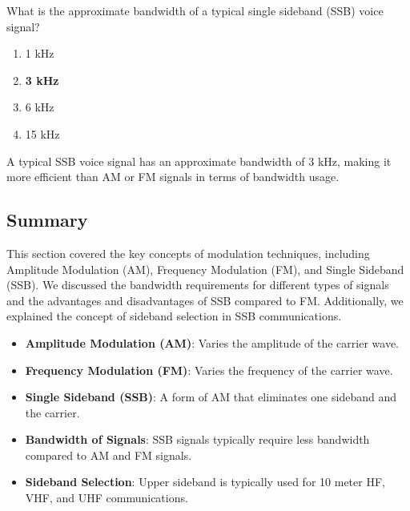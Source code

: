 
\begin{tcolorbox}[colback=gray!10!white,colframe=black!75!black,title={T8A08}]
    What is the approximate bandwidth of a typical single sideband (SSB) voice signal?
    \begin{enumerate}[label=\Alph*,noitemsep]
        \item 1 kHz
        \item \textbf{3 kHz}
        \item 6 kHz
        \item 15 kHz
    \end{enumerate}
\end{tcolorbox}
A typical SSB voice signal has an approximate bandwidth of 3 kHz, making it more efficient than AM or FM signals in terms of bandwidth usage.


\subsection*{Summary}
This section covered the key concepts of modulation techniques, including Amplitude Modulation (AM), Frequency Modulation (FM), and Single Sideband (SSB). We discussed the bandwidth requirements for different types of signals and the advantages and disadvantages of SSB compared to FM. Additionally, we explained the concept of sideband selection in SSB communications.

\begin{itemize}
    \item \textbf{Amplitude Modulation (AM)}: Varies the amplitude of the carrier wave.
    \item \textbf{Frequency Modulation (FM)}: Varies the frequency of the carrier wave.
    \item \textbf{Single Sideband (SSB)}: A form of AM that eliminates one sideband and the carrier.
    \item \textbf{Bandwidth of Signals}: SSB signals typically require less bandwidth compared to AM and FM signals.
    \item \textbf{Sideband Selection}: Upper sideband is typically used for 10 meter HF, VHF, and UHF communications.
\end{itemize}
